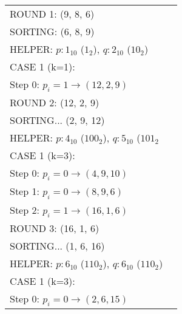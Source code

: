 \begin{center}
	\begin{tabular}{ll}     
		ROUND 1: (9, 8, 6)                                                       \\
		\noindent\hspace*{12mm} 	SORTING:               (6, 8, 9)             \\ 
		\noindent\hspace*{12mm} 	HELPER: $p:1_{10}$ ($1_{2}$), $q:2_{10}$ ($10_{2}$)     \\
		\noindent\hspace*{12mm} 	CASE 1 (k=1):    				             \\
		\noindent\hspace*{22mm}			Step 0: $p_i = 1 \rightarrow (12, 2, 9)$    \\
		ROUND 2: (12, 2, 9)                                                      \\      
		\noindent\hspace*{12mm} 	SORTING... (2, 9, 12)                        \\
		\noindent\hspace*{12mm} 	HELPER: $p:4_{10}$ ($100_{2}$), $q:5_{10}$ ($101_{2}$   \\
		\noindent\hspace*{12mm} 	CASE 1 (k=3):                                \\
		\noindent\hspace*{22mm}			Step 0: $p_i = 0 \rightarrow (4, 9, 10)$    \\
		\noindent\hspace*{22mm}			Step 1: $p_i = 0 \rightarrow (8, 9, 6)$     \\
		\noindent\hspace*{22mm}			Step 2: $p_i = 1 \rightarrow (16, 1, 6)$    \\
		ROUND 3: (16, 1, 6)                                                      \\
		\noindent\hspace*{12mm} 	SORTING... (1, 6, 16)                        \\
		\noindent\hspace*{12mm} 	HELPER: $p:6_{10}$ ($110_{2}$), $q:6_{10}$ ($110_{2}$)  \\
		\noindent\hspace*{12mm} 	CASE 1 (k=3):                                \\
		\noindent\hspace*{22mm}			Step 0: $p_i = 0 \rightarrow (2, 6, 15)$    \\

\end{tabular}
\end{center}
